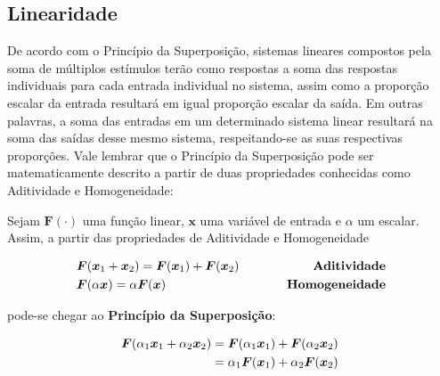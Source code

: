 \subsection{Linearidade}
\label{subsec:bss_linearity}

De acordo com o Princípio da Superposição, sistemas lineares compostos pela soma de múltiplos estímulos terão como respostas a soma das respostas individuais para cada entrada individual no sistema, assim como a proporção escalar da entrada resultará em igual proporção escalar da saída. Em outras palavras, a soma das entradas em um determinado sistema linear resultará na soma das saídas desse mesmo sistema, respeitando-se as suas respectivas proporções. Vale lembrar que o Princípio da Superposição pode ser matematicamente descrito a partir de duas propriedades conhecidas como Aditividade e Homogeneidade:\\

\begin{definition}
    Sejam $\bm{F}(\cdot)$ uma função linear, $\bm{x}$ uma variável de entrada e $\alpha$ um escalar. Assim, a partir das propriedades de Aditividade e Homogeneidade

    \begin{equation*}
        \begin{aligned}
            & \bm{F}(\bm{x}_{1} + \bm{x}_{2}) = \bm{F}(\bm{x}_{1}) + \bm{F}(\bm{x}_{2}) \hspace{0.5cm}& \text{\textbf{Aditividade}} \\
            & \bm{F}(\alpha \bm{x}) = \alpha \bm{F}(\bm{x}) & \hspace{0.5cm} \text{\textbf{Homogeneidade}}
        \end{aligned}
        \vspace{0.2cm}
    \end{equation*}

    \noindent pode-se chegar ao \textbf{Princípio da Superposição}:

    \begin{equation}
        \begin{aligned}
            \bm{F}(\alpha_{1} \bm{x}_{1} + \alpha_{2} \bm{x}_{2}) & = \bm{F}(\alpha_{1} \bm{x}_{1}) + \bm{F}(\alpha_{2} \bm{x}_{2})\\
             & = \alpha_{1} \bm{F}(\bm{x}_{1}) + \alpha_{2} \bm{F}(\bm{x}_{2})
        \end{aligned}
        \hspace{0.1cm}
        \vspace{0.2cm}
    \end{equation}

\end{definition}

